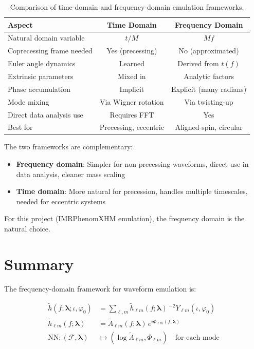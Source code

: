 \documentclass[11pt,a4paper]{article}
\newcommand{\htlm}{\tilde{h}_{\ell m}}
\newcommand{\Atlm}{\tilde{A}_{\ell m}}
\newcommand{\Philm}{\Phi_{\ell m}}
\newcommand{\Ylm}{{}^{-2}Y_{\ell m}}
\newcommand{\veclambda}{\bm{\lambda}}
\newcommand{\Mf}{\mathcal{F}}
\begin{document}
\begin{table}[h]
\centering
\begin{tabular}{lcc}
\toprule
\textbf{Aspect} & \textbf{Time Domain} & \textbf{Frequency Domain} \\
\midrule
Natural domain variable & $t/M$ & $Mf$ \\
Coprecessing frame needed & Yes (precessing) & No (approximated) \\
Euler angle dynamics & Learned & Derived from $t(f)$ \\
Extrinsic parameters & Mixed in & Analytic factors \\
Phase accumulation & Implicit & Explicit (many radians) \\
Mode mixing & Via Wigner rotation & Via twisting-up \\
Direct data analysis use & Requires FFT & Yes \\
\midrule
Best for & Precessing, eccentric & Aligned-spin, circular \\
\bottomrule
\end{tabular}
\caption{Comparison of time-domain and frequency-domain emulation frameworks.}
\label{tab:comparison}
\end{table}

The two frameworks are complementary:
\begin{itemize}
    \item \textbf{Frequency domain}: Simpler for non-precessing waveforms, direct use in data analysis, cleaner mass scaling
    \item \textbf{Time domain}: More natural for precession, handles multiple timescales, needed for eccentric systems
\end{itemize}

For this project (IMRPhenomXHM emulation), the frequency domain is the natural choice.

\section{Summary}

The frequency-domain framework for waveform emulation is:

\begin{align}
    \tilde{h}(f; \veclambda; \iota, \varphi_0) &= \sum_{\ell, m} \htlm(f; \veclambda) \, \Ylm(\iota, \varphi_0) \\[0.5em]
    \htlm(f; \veclambda) &= \Atlm(f; \veclambda) \, e^{i \Philm(f; \veclambda)} \\[0.5em]
    \text{NN}: (\Mf, \veclambda) &\mapsto (\log \Atlm, \Philm) \quad \text{for each mode}
\end{align}
\end{document}
